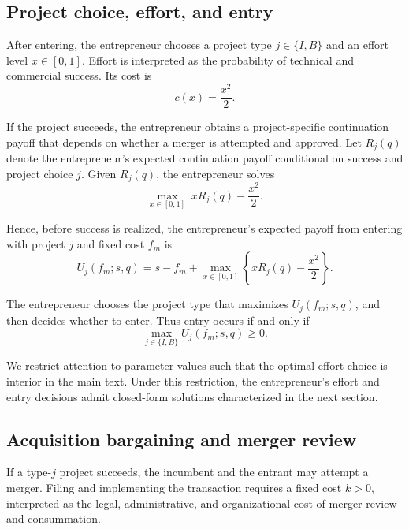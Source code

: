 \subsection{Project choice, effort, and entry}

After entering, the entrepreneur chooses a project type \(j \in \{I,B\}\) and an effort level \(x \in [0,1]\).
Effort is interpreted as the probability of technical and commercial success.
Its cost is
\begin{equation}
    c(x) = \frac{x^2}{2}.
\end{equation}

If the project succeeds, the entrepreneur obtains a project-specific continuation payoff that depends on whether a merger is attempted and approved.
Let \(R_j(q)\) denote the entrepreneur's expected continuation payoff conditional on success and project choice \(j\).
Given \(R_j(q)\), the entrepreneur solves
\begin{equation}
    \max_{x \in [0,1]} \; xR_j(q) - \frac{x^2}{2}.
\end{equation}

Hence, before success is realized, the entrepreneur's expected payoff from entering with project \(j\) and fixed cost \(f_m\) is
\begin{equation}
    U_j(f_m;s,q)
    =
    s - f_m
    + \max_{x \in [0,1]}
      \left\{
        xR_j(q) - \frac{x^2}{2}
      \right\}.
\end{equation}

The entrepreneur chooses the project type that maximizes \(U_j(f_m;s,q)\), and then decides whether to enter.
Thus entry occurs if and only if
\begin{equation}
    \max_{j \in \{I,B\}} U_j(f_m;s,q) \ge 0.
\end{equation}

We restrict attention to parameter values such that the optimal effort choice is interior in the main text.
Under this restriction, the entrepreneur's effort and entry decisions admit closed-form solutions characterized in the next section.

\subsection{Acquisition bargaining and merger review}

If a type-\(j\) project succeeds, the incumbent and the entrant may attempt a merger.
Filing and implementing the transaction requires a fixed cost \(k>0\), interpreted as the legal, administrative, and organizational cost of merger review and consummation.

